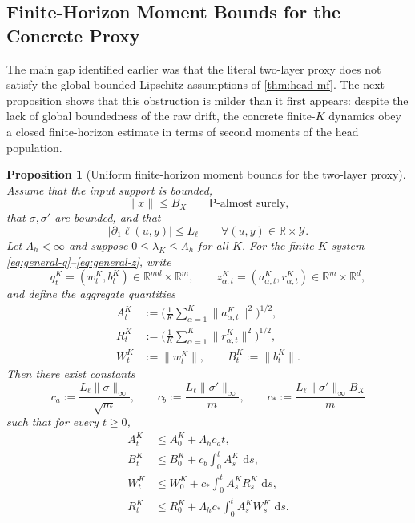 \documentclass{article}
\newtheorem{proposition}[theorem]{Proposition}
\theoremstyle{definition}
\newcommand{\R}{\mathbb{R}}
\newcommand{\dd}{\,\mathrm{d}}
\begin{document}
\subsection{Finite-Horizon Moment Bounds for the Concrete Proxy}

The main gap identified earlier was that the literal two-layer proxy does not satisfy the global bounded-Lipschitz assumptions of \cref{thm:head-mf}. The next proposition shows that this obstruction is milder than it first appears: despite the lack of global boundedness of the raw drift, the concrete finite-$K$ dynamics obey a closed finite-horizon estimate in terms of second moments of the head population.

\begin{proposition}[Uniform finite-horizon moment bounds for the two-layer proxy]
\label{prop:concrete-apriori}
Assume that the input support is bounded,
\[
  \|x\|\le B_X
  \qquad
  \mathsf P\text{-almost surely},
\]
that $\sigma,\sigma'$ are bounded, and that
\[
  |\partial_1\ell(u,y)|\le L_\ell
  \qquad
  \forall (u,y)\in\R\times\mathcal Y.
\]
Let $\Lambda_h<\infty$ and suppose $0\le \lambda_K\le \Lambda_h$ for all $K$. For the finite-$K$ system \eqref{eq:general-q}--\eqref{eq:general-z}, write
\[
  q_t^K=(w_t^K,b_t^K)\in\R^{md}\times\R^m,
  \qquad
  z_{\alpha,t}^K=(a_{\alpha,t}^K,r_{\alpha,t}^K)\in\R^m\times\R^d,
\]
and define the aggregate quantities
\begin{align}
  A_t^K
  &:=
  \biggl(
    \frac1K\sum_{\alpha=1}^K \|a_{\alpha,t}^K\|^2
  \biggr)^{1/2},
  \label{eq:A2-def}
  \\
  R_t^K
  &:=
  \biggl(
    \frac1K\sum_{\alpha=1}^K \|r_{\alpha,t}^K\|^2
  \biggr)^{1/2},
  \label{eq:R2-def}
  \\
  W_t^K &:= \|w_t^K\|,
  \qquad
  B_t^K := \|b_t^K\|.
  \label{eq:WB-def}
\end{align}
Then there exist constants
\[
  c_a := \frac{L_\ell\|\sigma\|_\infty}{\sqrt m},
  \qquad
  c_b := \frac{L_\ell\|\sigma'\|_\infty}{m},
  \qquad
  c_\ast := \frac{L_\ell\|\sigma'\|_\infty B_X}{m}
\]
such that for every $t\ge 0$,
\begin{align}
  A_t^K
  &\le
  A_0^K + \Lambda_h c_a t,
  \label{eq:concrete-A-bound}
  \\
  B_t^K
  &\le
  B_0^K + c_b \int_0^t A_s^K\,\dd s,
  \label{eq:concrete-B-bound}
  \\
  W_t^K
  &\le
  W_0^K + c_\ast \int_0^t A_s^K R_s^K\,\dd s,
  \label{eq:concrete-W-bound}
  \\
  R_t^K
  &\le
  R_0^K + \Lambda_h c_\ast \int_0^t A_s^K W_s^K\,\dd s.

\end{align}
\end{proposition}
\end{document}
